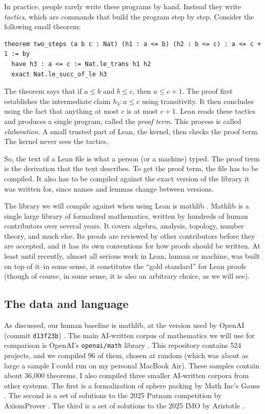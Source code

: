 \documentclass{article}
\begin{document}
In practice, people rarely write these programs by hand. Instead they write \textit{tactics}, which are commands that
build the program step by step. Consider the following small theorem:
\begin{verbatim}
theorem two_steps (a b c : Nat) (h1 : a <= b) (h2 : b <= c) : a <= c + 1 := by
  have h3 : a <= c := Nat.le_trans h1 h2
  exact Nat.le_succ_of_le h3
\end{verbatim}
The theorem says that if $a\leq b$ and $b\leq c$, then $a\leq c+1$. The proof first establishes the intermediate claim
$h_3 : a\leq c$ using transitivity. It then concludes using the fact that anything at most $c$ is at most $c+1$. Lean
reads these tactics and produces a single program, called the \textit{proof term}. This process is called
\textit{elaboration}. A small trusted part of Lean, the kernel, then checks the proof term. The kernel never sees the
tactics.

So, the text of a Lean file is what a person (or a machine) typed. The proof term is the
derivation that the text describes. To get the proof term, the file has to be compiled. It also has to be compiled
against the exact version of the library it was written for, since names and lemmas change between versions.

The library we will compile against when using Lean is mathlib \textit{\parencite{mathlib2020}}. Mathlib is a single large library of formalized 
mathematics, written by hundreds of human contributors over several years. It covers algebra, analysis, topology, number 
theory, and much else. Its proofs are reviewed by other contributors before they are accepted, and it has its own 
conventions for how proofs should be written. At least until recently, almost all serious work in Lean, human or machine, 
was built on top of it--in some sense, it constitutes the ``gold standard'' for Lean proofs (though of course, in some sense, 
it is also an arbitrary choice, as we will see).

\subsection{The data and language}
As discussed, our human baseline is mathlib, at the version used by OpenAI (commit \texttt{d13f23b}) \textit{\parencite{mathlib4}}. The main
AI-written corpus of mathematics we will use for comparison is OpenAI's \texttt{openai/math} library \textit{\parencite{openai_math}}. This repository contains 
524 projects, and we compiled 96 of them, chosen at random (which was about as large a sample I could run on my personal 
MacBook Air). These samples contain about 36,000 theorems. I also compiled three smaller AI-written corpora from other 
systems. The first is a formalization of sphere packing by Math Inc's Gauss \textit{\parencite{spherepacking_lean,hariharan2026spherepacking}}. The second is a set of solutions to the 
2025 Putnam competition by AxiomProver \textit{\parencite{axiom_putnam2025}}. The third is a set of solutions to the 2025 IMO by Aristotle \textit{\parencite{harmonic_imo2025,achim2025aristotle}}. 
\end{document}
